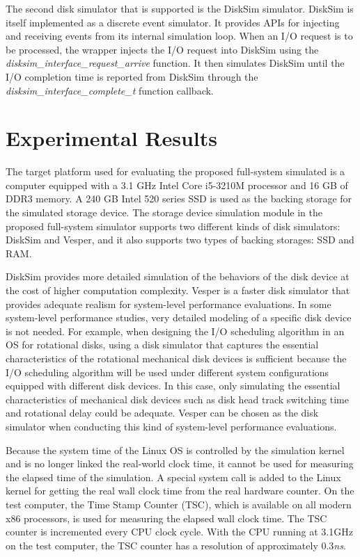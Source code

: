 The second disk simulator that is supported is the DiskSim simulator. DiskSim is itself implemented as a discrete event simulator. It provides APIs for injecting and receiving events from its internal simulation loop. When an I/O request is to be processed, the wrapper injects the I/O request into DiskSim using the \textit{disksim_interface_request_arrive} function. It then simulates DiskSim until the I/O completion time is reported from DiskSim through the \textit{disksim_interface_complete_t} function callback.

\section{Experimental Results}
\label{sec:ch5-experimental-results}
The target platform used for evaluating the proposed full-system simulated is a computer equipped with a 3.1 GHz Intel Core i5-3210M processor and 16 GB of DDR3 memory. A 240 GB Intel 520 series SSD is used as the backing storage for the simulated storage device. The storage device simulation module in the proposed full-system simulator supports two different kinds of disk simulators: DiskSim and Vesper, and it also supports two types of backing storages: SSD and RAM.

DiskSim provides more detailed simulation of the behaviors of the disk device at the cost of higher computation complexity. Vesper is a faster disk simulator that provides adequate realism for system-level performance evaluations. In some system-level performance studies, very detailed modeling of a specific disk device is not needed. For example, when designing the I/O scheduling algorithm in an OS for rotational disks, using a disk simulator that captures the essential characteristics of the rotational mechanical disk devices is sufficient because the I/O scheduling algorithm will be used under different system configurations equipped with different disk devices. In this case, only simulating the essential characteristics of mechanical disk devices such as disk head track switching time and rotational delay could be adequate. Vesper can be chosen as the disk simulator when conducting this kind of system-level performance evaluations.

Because the system time of the Linux OS is controlled by the simulation kernel and is no longer linked the real-world clock time, it cannot be used for measuring the elapsed time of the simulation. A special system call is added to the Linux kernel for getting the real wall clock time from the real hardware counter. On the test computer, the Time Stamp Counter (TSC), which is available on all modern x86 processors, is used for measuring the elapsed wall clock time. The TSC counter is incremented every CPU clock cycle. With the CPU running at 3.1GHz on the test computer, the TSC counter has a resolution of approximately 0.3\textit{ns}.

